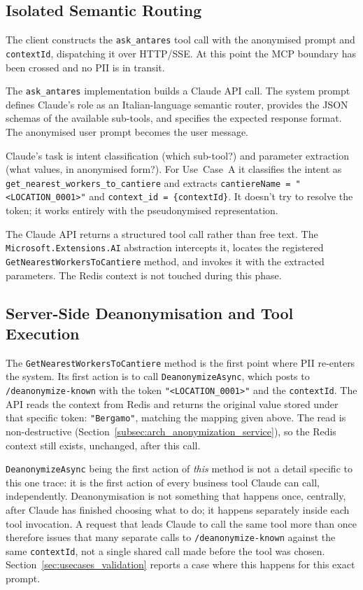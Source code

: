 \subsection{Isolated Semantic Routing}
\label{subsec:arch_semantic_routing}

The client constructs the \texttt{ask\_antares} tool call with the anonymised prompt and \texttt{contextId}, dispatching it over HTTP/SSE. At this point the MCP boundary has been crossed and no PII is in transit.

The \texttt{ask\_antares} implementation builds a Claude API call. The system prompt defines Claude's role as an Italian-language semantic router, provides the JSON schemas of the available sub-tools, and specifies the expected response format. The anonymised user prompt becomes the user message.

Claude's task is intent classification (which sub-tool?) and parameter extraction (what values, in anonymised form?). For Use~Case~A it classifies the intent as \texttt{get\_nearest\_workers\_to\_cantiere} and extracts \texttt{cantiereName = "<LOCATION\_0001>"} and \texttt{context\_id = \{contextId\}}. It doesn't try to resolve the token; it works entirely with the pseudonymised representation.

The Claude API returns a structured tool call rather than free text. The \texttt{Microsoft.Extensions.AI} abstraction intercepts it, locates the registered \texttt{GetNearestWorkersToCantiere} method, and invokes it with the extracted parameters. The Redis context is not touched during this phase.

\subsection{Server-Side Deanonymisation and Tool Execution}
\label{subsec:arch_deanonymization}

The \texttt{GetNearestWorkersToCantiere} method is the first point where PII re-enters the system. Its first action is to call \texttt{DeanonymizeAsync}, which posts to \texttt{/deanonymize-known} with the token \texttt{"<LOCATION\_0001>"} and the \texttt{contextId}. The API reads the context from Redis and returns the original value stored under that specific token: \texttt{"Bergamo"}, matching the mapping given above. The read is non-destructive (Section~\ref{subsec:arch_anonymization_service}), so the Redis context still exists, unchanged, after this call.

\texttt{DeanonymizeAsync} being the first action of \emph{this} method is not a detail specific to this one trace: it is the first action of every business tool Claude can call, independently. Deanonymisation is not something that happens once, centrally, after Claude has finished choosing what to do; it happens separately inside each tool invocation. A request that leads Claude to call the same tool more than once therefore issues that many separate calls to \texttt{/deanonymize-known} against the same \texttt{contextId}, not a single shared call made before the tool was chosen. Section~\ref{sec:usecases_validation} reports a case where this happens for this exact prompt.

